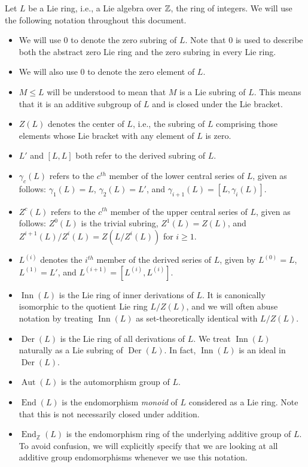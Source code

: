 Let $L$ be a Lie ring, i.e., a Lie algebra over $\mathbb{Z}$, the ring of
integers. We will use the following notation throughout this document.

\begin{itemize}
\item We will use $0$ to denote the zero subring of $L$. Note that $0$
  is used to describe both the abstract zero Lie ring and the zero
  subring in every Lie ring.
\item We will also use $0$ to denote the zero element of $L$.
\item $M \le L$ will be understood to mean that $M$ is a Lie subring
  of $L$. This means that it is an additive subgroup of $L$ and is
  closed under the Lie bracket.
\item $Z(L)$ denotes the center of $L$, i.e., the subring of $L$
  comprising those elements whose Lie bracket with any element of $L$
  is zero.
\item $L'$ and $[L,L]$ both refer to the derived subring of $L$.
\item $\gamma_c(L)$ refers to the $c^{th}$ member of the lower central
  series of $L$, given as follows: $\gamma_1(L) = L$, $\gamma_2(L) =
  L'$, and $\gamma_{i+1}(L) = [L,\gamma_i(L)]$.
\item $Z^c(L)$ refers to the $c^{th}$ member of the upper central
  series of $L$, given as follows: $Z^0(L)$ is the trivial subring,
  $Z^1(L) = Z(L)$, and $Z^{i+1}(L)/Z^i(L) = Z(L/Z^i(L))$ for
  $i \ge 1$.
\item $L^{(i)}$ denotes the $i^{th}$ member of the derived series of
  $L$, given by $L^{(0)} = L$, $L^{(1)} = L'$, and $L^{(i+1)} =
  [L^{(i)},L^{(i)}]$.
\item $\operatorname{Inn}(L)$ is the Lie ring of inner derivations of
  $L$. It is canonically isomorphic to the quotient Lie ring $L/Z(L)$,
  and we will often abuse notation by treating $\operatorname{Inn}(L)$
  as set-theoretically identical with $L/Z(L)$.
\item $\operatorname{Der}(L)$ is the Lie ring of all derivations of
  $L$. We treat $\operatorname{Inn}(L)$ naturally as a Lie subring of
  $\operatorname{Der}(L)$. In fact, $\operatorname{Inn}(L)$ is an
  ideal in $\operatorname{Der}(L)$.
\item $\operatorname{Aut}(L)$ is the automorphism group of $L$.
\item $\operatorname{End}(L)$ is the endomorphism {\em monoid} of $L$
  considered as a Lie ring. Note that this is not necessarily closed
  under addition.
\item $\operatorname{End}_{\mathbb{Z}}(L)$ is the endomorphism ring of
  the underlying additive group of $L$. To avoid confusion, we will
  explicitly specify that we are looking at all additive group
  endomorphisms whenever we use this notation.

\end{itemize}

